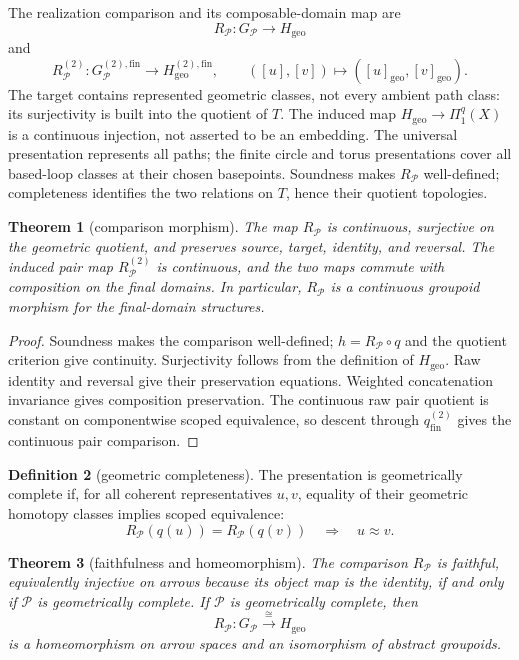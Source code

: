\documentclass[10pt,reqno]{amsart}
\theoremstyle{definition}
\newtheorem{definition}{Definition}[section]
\theoremstyle{plain}
\newtheorem{theorem}[definition]{Theorem}
\theoremstyle{remark}
\newcommand{\Fin}{\mathrm{fin}}
\begin{document}
The realization comparison and its composable-domain map are
\[
  R_{\mathcal P}:G_{\mathcal P}\longrightarrow H_{\mathrm{geo}}
\]
and
\[
  R_{\mathcal P}^{(2)}:G_{\mathcal P}^{(2),\Fin}\longrightarrow
  H_{\mathrm{geo}}^{(2),\Fin},
  \qquad ([u],[v])\longmapsto([u]_{\mathrm{geo}},[v]_{\mathrm{geo}}).
\]
The target contains represented geometric classes, not every ambient
path class: its surjectivity is built into the quotient of $T$.
The induced map $H_{\mathrm{geo}}\to\Pi_1^q(X)$ is a continuous injection,
not asserted to be an embedding. The universal presentation represents
all paths; the finite circle and torus presentations cover all based-loop
classes at their chosen basepoints. Soundness makes $R_{\mathcal P}$
well-defined; completeness identifies the two relations on $T$, hence
their quotient topologies.

\begin{theorem}[comparison morphism]
The map $R_{\mathcal P}$ is continuous, surjective on the geometric quotient,
and preserves source, target, identity, and reversal.
The induced pair map $R_{\mathcal P}^{(2)}$ is continuous, and the two maps
commute with composition on the final domains.  In particular,
$R_{\mathcal P}$ is a continuous groupoid morphism for the final-domain
structures.
\end{theorem}

\begin{proof}
Soundness makes the comparison well-defined; $h=R_{\mathcal P}\circ q$
and the quotient criterion give continuity. Surjectivity follows from the
definition of $H_{\mathrm{geo}}$. Raw identity and reversal give their
preservation equations. Weighted concatenation invariance gives composition
preservation. The continuous raw pair quotient is constant on componentwise
scoped equivalence, so descent through $q_{\Fin}^{(2)}$ gives the continuous
pair comparison.
\end{proof}

\begin{definition}[geometric completeness]
The presentation is geometrically complete if, for all coherent representatives
$u,v$, equality of their geometric homotopy classes implies scoped equivalence:
\[
  R_{\mathcal P}(q(u))=R_{\mathcal P}(q(v))
  \quad\Longrightarrow\quad u\approx v.
\]
\end{definition}

\begin{theorem}[faithfulness and homeomorphism]
\label{thm:faithfulness-homeomorphism}
The comparison $R_{\mathcal P}$ is faithful, equivalently injective on arrows
because its object map is the identity, if and only if $\mathcal P$ is
geometrically complete.  If $\mathcal P$ is geometrically complete, then
\[
  R_{\mathcal P}:G_{\mathcal P}\xrightarrow{\ \cong\ }H_{\mathrm{geo}}
\]
is a homeomorphism on arrow spaces and an isomorphism of abstract groupoids.
\end{theorem}
\end{document}
